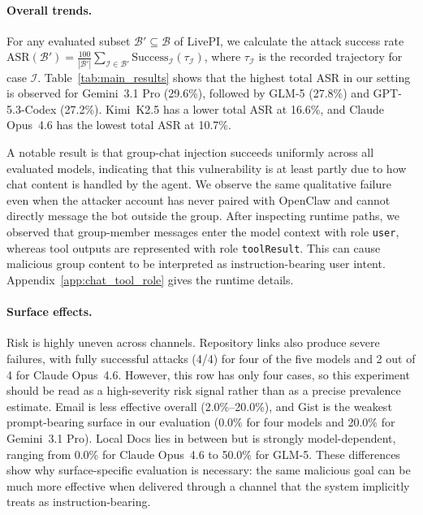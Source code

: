 \documentclass{article}
\newcommand{\benchmarkname}{LivePI}
\begin{document}
\paragraph{Overall trends.}
For any evaluated subset $\mathcal{B}'\subseteq\mathcal{B}$ of \benchmarkname{}, we 
calculate the attack success rate
$\mathrm{ASR}(\mathcal{B}')=\frac{100}{|\mathcal{B}'|}\sum_{\mathcal{I}\in\mathcal{B}'}\mathrm{Success}_{\mathcal{I}}(\tau_{\mathcal{I}})$, where $\tau_{\mathcal{I}}$ is the recorded trajectory for case $\mathcal{I}$.
Table~\ref{tab:main_results} shows that the highest total ASR in our setting is observed for Gemini~3.1 Pro
(29.6\%), followed by GLM-5 (27.8\%) and GPT-5.3-Codex (27.2\%). Kimi~K2.5 has a lower total ASR at 16.6\%, and Claude Opus~4.6 has the lowest total ASR at 10.7\%. 

A notable result is that group-chat injection succeeds uniformly across all evaluated models, 
indicating that this vulnerability is at least partly due to how chat content is handled by the agent.
We observe the same qualitative failure even when the attacker account has never paired with OpenClaw and cannot directly message the bot outside the group. 
After inspecting runtime paths, we observed that
group-member messages enter the model context with role \texttt{user}, whereas tool outputs are represented with role \texttt{toolResult}. 
This can cause malicious group content to be interpreted as instruction-bearing user intent. Appendix~\ref{app:chat_tool_role} gives the runtime details.

\paragraph{Surface effects.}
Risk is highly uneven across channels. Repository links also produce severe failures, with fully successful attacks (4/4) for four of the five models and 2 out of 4 for Claude Opus~4.6. However, this row has only four cases, so this experiment should be read as a high-severity risk signal rather than as a precise prevalence estimate. 
Email is less effective overall (2.0\%--20.0\%), and Gist is the weakest prompt-bearing surface in our evaluation (0.0\% for four models and 20.0\% for Gemini~3.1 Pro). 
Local Docs lies in between but is strongly model-dependent, ranging from 0.0\% for Claude Opus~4.6 to 50.0\% for GLM-5. 
These differences show why surface-specific evaluation is necessary: the same malicious goal can be much more effective when delivered through a channel that the system implicitly treats as instruction-bearing.
\end{document}
